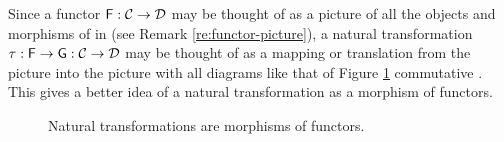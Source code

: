 \begin{remark}
  \label{re:natural-translation}

  Since a functor $\mathsf{F}: \mathcal{C} \to \mathcal{D}$ may be thought of as
  a picture of all the objects and morphisms of  in 
  (see Remark \ref{re:functor-picture}), a natural transformation
  $\tau: \mathsf{F} \to \mathsf{G}: \mathcal{C} \to \mathcal{D}$ may be
  thought of as a mapping or translation from the picture 
  into the picture  with all diagrams like that of Figure
  \ref{fig:natural-translation} commutative
  \parencite[16]{maclane-1998}. This gives a better idea of a natural
  transformation as a morphism of functors.
  \begin{figure}[htbp]
    \begin{center}
    \end{center}
    \caption{Natural transformations are morphisms of functors.}
    \label{fig:natural-translation}
  \end{figure}

\end{remark}

